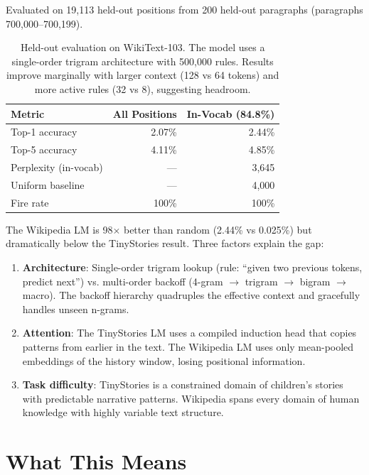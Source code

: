 \documentclass[11pt,a4paper]{article}
\begin{document}
Evaluated on 19,113 held-out positions from 200 held-out paragraphs (paragraphs 700,000--700,199).

\begin{table}[h]
\centering
\begin{tabular}{lrr}
\hline
\textbf{Metric} & \textbf{All Positions} & \textbf{In-Vocab (84.8\%)} \\
\hline
Top-1 accuracy & 2.07\% & 2.44\% \\
Top-5 accuracy & 4.11\% & 4.85\% \\
Perplexity (in-vocab) & --- & 3,645 \\
Uniform baseline & --- & 4,000 \\
Fire rate & 100\% & 100\% \\
\hline
\end{tabular}
\caption{Held-out evaluation on WikiText-103. The model uses a single-order trigram architecture with 500,000 rules. Results improve marginally with larger context (128 vs 64 tokens) and more active rules (32 vs 8), suggesting headroom.}
\end{table}

The Wikipedia LM is 98$\times$ better than random (2.44\% vs 0.025\%) but dramatically below
the TinyStories result. Three factors explain the gap:

\begin{enumerate}[leftmargin=*]
\item \textbf{Architecture}: Single-order trigram lookup (rule: ``given two previous tokens, predict next'') vs. multi-order backoff (4-gram $\rightarrow$ trigram $\rightarrow$ bigram $\rightarrow$ macro). The backoff hierarchy quadruples the effective context and gracefully handles unseen n-grams.
\item \textbf{Attention}: The TinyStories LM uses a compiled induction head that copies patterns from earlier in the text. The Wikipedia LM uses only mean-pooled embeddings of the history window, losing positional information.
\item \textbf{Task difficulty}: TinyStories is a constrained domain of children's stories with predictable narrative patterns. Wikipedia spans every domain of human knowledge with highly variable text structure.
\end{enumerate}

\section{What This Means}
\end{document}
